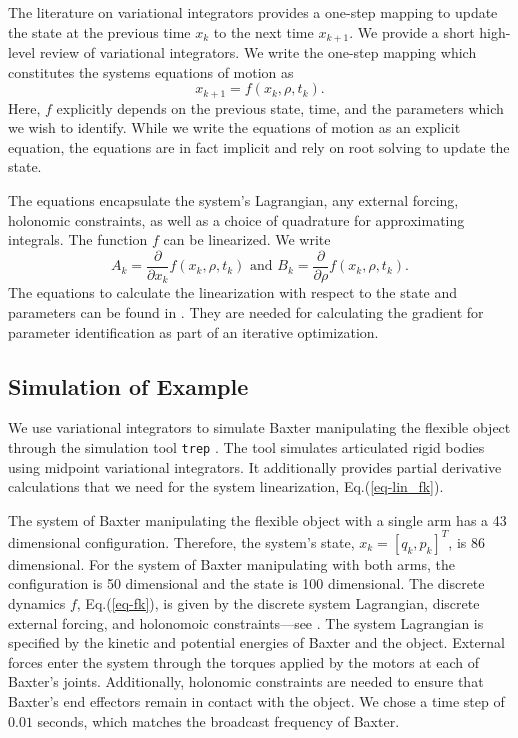 \documentclass[runningheads,a4paper]{llncs}
\begin{document}
The literature on variational integrators \cite{marsden_west} provides a one-step mapping to update the state at the previous time $x_k$ to the next time $x_{k+1}$.  We provide a short high-level review of variational integrators.  We write the one-step mapping which constitutes the systems equations of motion as 
\begin{equation}
x_{k+1} = f(x_k,\rho,t_k).
\label{eq-fk}
\end{equation}
Here, $f$ explicitly depends on the previous state, time, and the parameters which we wish to identify.  While we write the equations of motion as an explicit equation, the equations are in fact implicit and rely on root solving to update the state. 

The equations encapsulate the system's Lagrangian, any external forcing, holonomic constraints, as well as a choice of quadrature for approximating integrals.  The function $f$ can be linearized. We write 
\begin{equation}
A_k = \frac{\partial}{\partial x_k}f(x_k,\rho,t_k) \textrm{ and } B_k = \frac{\partial}{\partial \rho}f(x_k,\rho,t_k).
\label{eq-lin_fk}
\end{equation}
The equations to calculate the linearization with respect to the state and parameters can be found in \cite{caldwell_coleman_correll_iros}. They are needed for calculating the gradient for parameter identification as part of an iterative optimization.

\subsection{Simulation of Example}
We use variational integrators to simulate Baxter manipulating the flexible object through the simulation tool \texttt{trep} \cite{johnson_murphey_scalable}.  The tool simulates articulated rigid bodies using midpoint variational integrators.  It additionally provides partial derivative calculations that we need for the system linearization, Eq.(\ref{eq-lin_fk}). 

The system of Baxter manipulating the flexible object with a single arm has a 43 dimensional configuration. Therefore, the system's state,  $x_k = [q_k,p_k]^T$, is 86 dimensional. For the system of Baxter manipulating with both arms, the configuration is 50 dimensional and the state is 100 dimensional. The discrete dynamics $f$, Eq.(\ref{eq-fk}), is given by the discrete system Lagrangian, discrete external forcing, and holonomoic constraints---see \cite{caldwell_coleman_correll_iros,marsden_west}.  The system Lagrangian is specified by the kinetic and potential energies of Baxter and the object.  External forces enter the system through the torques applied by the motors at each of Baxter's joints.  Additionally, holonomic constraints are needed to ensure that Baxter's end effectors remain in contact with the object.  We chose a time step of $0.01$ seconds, which matches the broadcast frequency of Baxter. 
\end{document}
